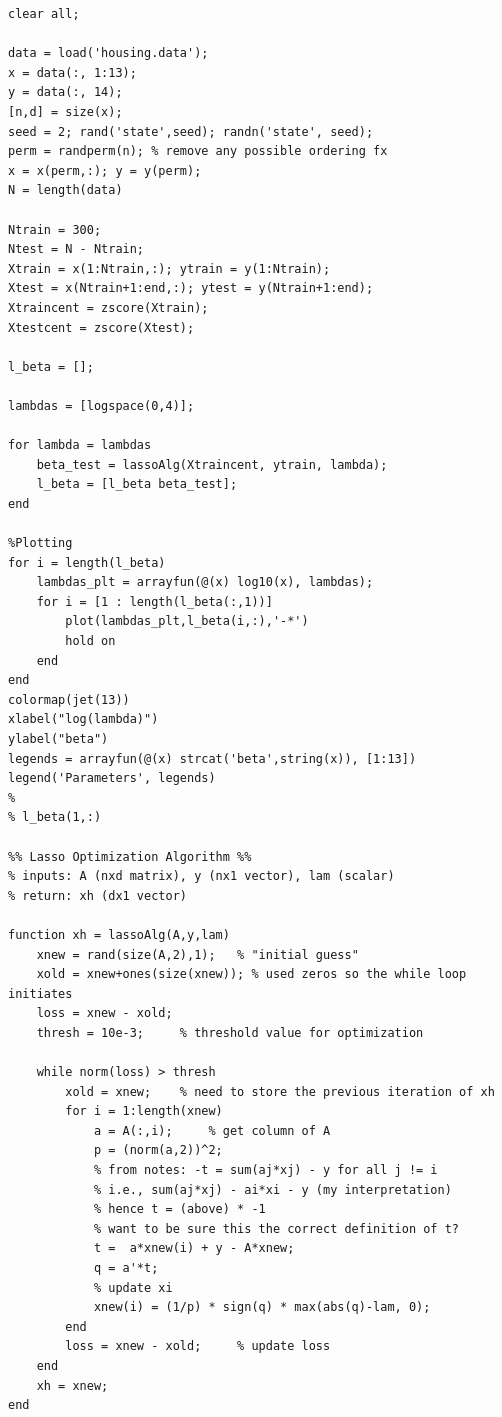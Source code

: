 \documentclass[11pt]{article}
\begin{document}
\begin{verbatim}
clear all;

data = load('housing.data');
x = data(:, 1:13);
y = data(:, 14);
[n,d] = size(x);
seed = 2; rand('state',seed); randn('state', seed);
perm = randperm(n); % remove any possible ordering fx
x = x(perm,:); y = y(perm);
N = length(data)

Ntrain = 300;
Ntest = N - Ntrain;
Xtrain = x(1:Ntrain,:); ytrain = y(1:Ntrain);
Xtest = x(Ntrain+1:end,:); ytest = y(Ntrain+1:end);
Xtraincent = zscore(Xtrain);
Xtestcent = zscore(Xtest);

l_beta = [];

lambdas = [logspace(0,4)];

for lambda = lambdas
    beta_test = lassoAlg(Xtraincent, ytrain, lambda);  
    l_beta = [l_beta beta_test];
end

%Plotting
for i = length(l_beta)
    lambdas_plt = arrayfun(@(x) log10(x), lambdas);
    for i = [1 : length(l_beta(:,1))]
        plot(lambdas_plt,l_beta(i,:),'-*')
        hold on
    end
end
colormap(jet(13))
xlabel("log(lambda)")
ylabel("beta")
legends = arrayfun(@(x) strcat('beta',string(x)), [1:13])
legend('Parameters', legends)
%
% l_beta(1,:)

%% Lasso Optimization Algorithm %%
% inputs: A (nxd matrix), y (nx1 vector), lam (scalar)
% return: xh (dx1 vector)

function xh = lassoAlg(A,y,lam)     
    xnew = rand(size(A,2),1);   % "initial guess" 
    xold = xnew+ones(size(xnew)); % used zeros so the while loop initiates
    loss = xnew - xold;
    thresh = 10e-3;     % threshold value for optimization

    while norm(loss) > thresh
        xold = xnew;    % need to store the previous iteration of xh
        for i = 1:length(xnew)
            a = A(:,i);     % get column of A
            p = (norm(a,2))^2;
            % from notes: -t = sum(aj*xj) - y for all j != i
            % i.e., sum(aj*xj) - ai*xi - y (my interpretation)
            % hence t = (above) * -1
            % want to be sure this the correct definition of t?
            t =  a*xnew(i) + y - A*xnew; 
            q = a'*t;
            % update xi
            xnew(i) = (1/p) * sign(q) * max(abs(q)-lam, 0);
        end
        loss = xnew - xold;     % update loss 
    end
    xh = xnew;
end
\end{verbatim}
\end{document}
